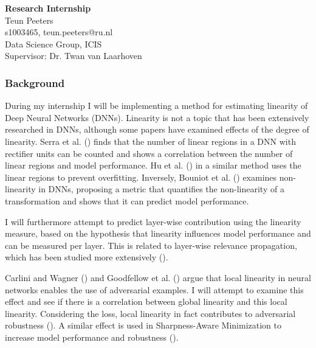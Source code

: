 \documentclass[]{article}
\begin{document}
\begin{center}
    \large
    \textbf{Research Internship}\\
    \normalsize
    Teun Peeters\\
    s1003465, teun.peeters@ru.nl\\
    \vspace*{0.5cm}
    Data Science Group, ICIS\\
    Supervisor: Dr. Twan van Laarhoven
\end{center}
\vspace*{0.5cm}
\subsubsection*{Background}
\noindent During my internship I will be implementing a method for estimating linearity of Deep Neural Networks (DNNs). Linearity is not a topic that has been extensively researched in DNNs, although some papers have examined effects of the degree of linearity. Serra et al. (\citeyear{serra_bounding_2018}) finds that the number of linear regions in a DNN with rectifier units can be counted and shows a correlation between the number of linear regions and model performance. Hu et al. (\citeyear{hu_measuring_2020}) in a similar method uses the linear regions to prevent overfitting. Inversely, Bouniot et al. (\citeyear{bouniot_understanding_2023}) examines non-linearity in DNNs, proposing a metric that quantifies the non-linearity of a transformation and shows that it can predict model performance. 

\noindent
I will furthermore attempt to predict layer-wise contribution using the linearity measure, based on the hypothesis that linearity influences model performance and can be measured per layer. This is related to layer-wise relevance propagation, which has been studied more extensively (\cite{montavon_layer-wise_2019}).

\noindent
Carlini and Wagner (\citeyear{carlini_towards_2017}) and Goodfellow et al. (\citeyear{goodfellow_explaining_2015}) argue that local linearity in neural networks enables the use of adversarial examples. I will attempt to examine this effect and see if there is a correlation between global linearity and this local linearity. Considering the loss, local linearity in fact contributes to adversarial robustness (\cite{qin_adversarial_2019}). A similar effect is used in Sharpness-Aware Minimization to increase model performance and robustness (\cite{foret_sharpness-aware_2021}).
\end{document}
